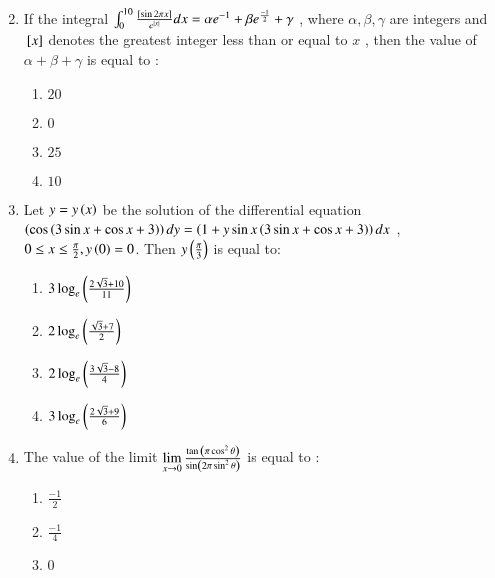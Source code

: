 \documentclass[journal,12pt,onecolumn]{IEEEtran}
\theoremstyle{remark}
\begin{document}
\begin{enumerate}
\begin{multicols}{2}
\begin{enumerate}
       \end{enumerate}
   \end{multicols}
   \item If the integral $\int_0^{10} \frac{{}\left[\sin{2\pi x}\right]}{e^{\left\vert x\right\vert}} dx = \alpha{e^{-1}} + \beta{e^{\frac{-1}{2}}} + \gamma$ , where $\alpha  , \beta , \gamma$ are integers and ${}\left[x\right]$ denotes the greatest integer less than or equal to $x$ , then the value of $\alpha + \beta + \gamma$ is equal to : 
   \begin{multicols}{2}
       \begin{enumerate}
           \item $20$
           \item $0$\\
           \item $25$
           \item $10$
       \end{enumerate}
   \end{multicols}
   \item Let $y = y\left(x\right)$ be the solution of the differential equation \\$\left(\cos\left({3\sin{x} + \cos{x} + 3 }\right)\right)dy = \left(1 + y\sin{x}\left(3\sin{x}+ \cos{x} +3\right)\right)dx$ , $0 \leq x \leq \frac{\pi}{2}, y\left(0\right)=0$.
   Then $y\left(\frac{\pi}{3}\right)$ is equal to:
   \begin{multicols}{2}
       \begin{enumerate}
           \item $3\log_e \left(\frac{2\sqrt{3}+10}{11}\right)$\\
           \item $2\log_e \left(\frac{\sqrt{3}+7}{2}\right)$
           \item $2\log_e \left(\frac{3\sqrt{3}-8}{4}\right)$\\
           \item $3\log_e \left(\frac{2\sqrt{3}+9}{6}\right)$
       \end{enumerate}
   \end{multicols}
   \item The value of the limit $\lim\limits_{x \to 0} \frac{\tan{\ensuremath{\left(\pi \cos^2{\theta}\right)}}}{\sin \left(2 \pi \sin^2{\theta}\right)}$ is equal to :
   \begin{multicols}{2}
   \begin{enumerate}
       \item $\frac{-1}{2}$\\
       \item $\frac{-1}{4}$
       \item $0$\\

\end{enumerate}
\end{multicols}
\end{enumerate}
\end{document}

